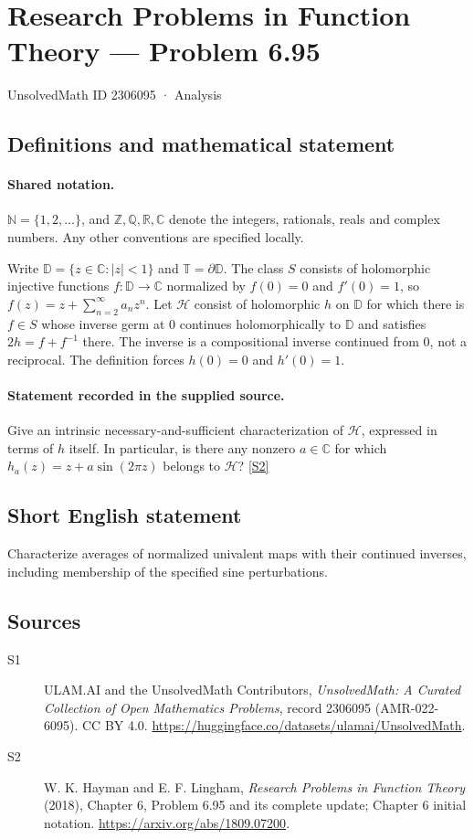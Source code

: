 \documentclass[11pt]{article}
\newcommand{\sref}[2]{\hyperlink{source:#1:#2}{[S#2]}}
\begin{document}
\setcounter{section}{2306094}
\section{Research Problems in Function Theory — Problem 6.95}\label{2306095}
{\small\sffamily UnsolvedMath ID 2306095 · Analysis}
\subsection{Definitions and mathematical statement}

\paragraph{Shared notation.}$\mathbb N=\{1,2,\ldots\}$, and $\mathbb Z,\mathbb Q,\mathbb R,\mathbb C$ denote the integers, rationals, reals and complex numbers. Any other conventions are specified locally.


Write $\mathbb D=\{z\in\mathbb C:|z|<1\}$ and $\mathbb T=\partial\mathbb D$. The class $S$ consists of holomorphic injective functions $f:\mathbb D\to\mathbb C$ normalized by $f(0)=0$ and $f'(0)=1$, so $f(z)=z+\sum_{n=2}^{\infty}a_nz^n$. Let $\mathcal H$ consist of holomorphic $h$ on $\mathbb D$ for which there is $f\in S$ whose inverse germ at $0$ continues holomorphically to $\mathbb D$ and satisfies $2h=f+f^{-1}$ there. The inverse is a compositional inverse continued from $0$, not a reciprocal. The definition forces $h(0)=0$ and $h'(0)=1$.
\paragraph{Statement recorded in the supplied source.}
Give an intrinsic necessary-and-sufficient characterization of $\mathcal H$, expressed in terms of $h$ itself. In particular, is there any nonzero $a\in\mathbb C$ for which $h_a(z)=z+a\sin(2\pi z)$ belongs to $\mathcal H$? \sref{2306095}{2}
\subsection{Short English statement}
Characterize averages of normalized univalent maps with their continued inverses, including membership of the specified sine perturbations.
\subsection{Sources}
\begin{description}
\item[\hypertarget{source:2306095:1}{S1}] ULAM.AI and the UnsolvedMath Contributors, \emph{UnsolvedMath: A Curated Collection of Open Mathematics Problems}, record 2306095 (AMR-022-6095). CC BY 4.0. \url{https://huggingface.co/datasets/ulamai/UnsolvedMath}.
\item[\hypertarget{source:2306095:2}{S2}] W. K. Hayman and E. F. Lingham, \emph{Research Problems in Function Theory} (2018), Chapter 6, Problem 6.95 and its complete update; Chapter 6 initial notation. \url{https://arxiv.org/abs/1809.07200}.
\end{description}
\label{end:2306095}
\end{document}
